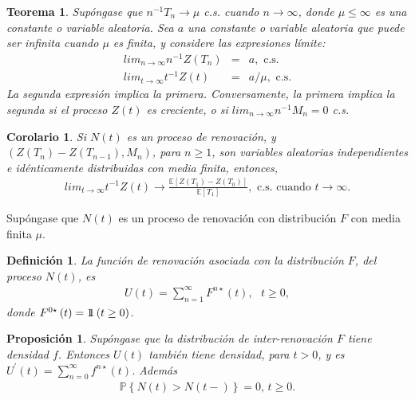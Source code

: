 \documentclass{article}
\newtheorem{Def}{Definición}[section]
\newtheorem{Teo}{Teorema}[section]
\newtheorem{Prop}{Proposición}[section]
\newtheorem{Coro}{Corolario}[section]
\newcommand{\esp}{\mathbb{E}}
\newcommand{\prob}{\mathbb{P}}
\newcommand{\indora}{\mbox{$1$\hspace{-0.8ex}$1$}}
\numberwithin{equation}{section}
\begin{document}
{\begin{Teo}
Sup\'ongase que $n^{-1}T_{n}\rightarrow\mu$ c.s. cuando $n\rightarrow\infty$, donde $\mu\leq\infty$ es una constante o variable aleatoria. Sea $a$ una constante o variable aleatoria que puede ser infinita cuando $\mu$ es finita, y considere las expresiones l\'imite:
\begin{eqnarray}
lim_{n\rightarrow\infty}n^{-1}Z\left(T_{n}\right)&=&a,\textrm{ c.s.}\\
lim_{t\rightarrow\infty}t^{-1}Z\left(t\right)&=&a/\mu,\textrm{ c.s.}
\end{eqnarray}
La segunda expresi\'on implica la primera. Conversamente, la primera implica la segunda si el proceso $Z\left(t\right)$ es creciente, o si $lim_{n\rightarrow\infty}n^{-1}M_{n}=0$ c.s.
\end{Teo}

\begin{Coro}
Si $N\left(t\right)$ es un proceso de renovaci\'on, y $\left(Z\left(T_{n}\right)-Z\left(T_{n-1}\right),M_{n}\right)$, para $n\geq1$, son variables aleatorias independientes e id\'enticamente distribuidas con media finita, entonces,
\begin{eqnarray}
lim_{t\rightarrow\infty}t^{-1}Z\left(t\right)\rightarrow\frac{\esp\left[Z\left(T_{1}\right)-Z\left(T_{0}\right)\right]}{\esp\left[T_{1}\right]},\textrm{ c.s. cuando  }t\rightarrow\infty.
\end{eqnarray}
\end{Coro}


Sup\'ongase que $N\left(t\right)$ es un proceso de renovaci\'on con distribuci\'on $F$ con media finita $\mu$.

\begin{Def}
La funci\'on de renovaci\'on asociada con la distribuci\'on $F$, del proceso $N\left(t\right)$, es
\begin{eqnarray*}
U\left(t\right)=\sum_{n=1}^{\infty}F^{n\star}\left(t\right),\textrm{   }t\geq0,
\end{eqnarray*}
donde $F^{0\star}\left(t\right)=\indora\left(t\geq0\right)$.
\end{Def}


\begin{Prop}
Sup\'ongase que la distribuci\'on de inter-renovaci\'on $F$ tiene densidad $f$. Entonces $U\left(t\right)$ tambi\'en tiene densidad, para $t>0$, y es $U^{'}\left(t\right)=\sum_{n=0}^{\infty}f^{n\star}\left(t\right)$. Adem\'as
\begin{eqnarray*}
\prob\left\{N\left(t\right)>N\left(t-\right)\right\}=0\textrm{,   }t\geq0.
\end{eqnarray*}
\end{Prop}

}
\end{document}
